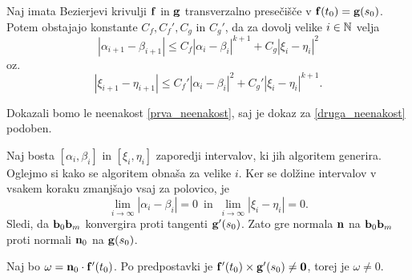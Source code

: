 \begin{trditev}
Naj imata Bezierjevi krivulji ${\bf f}$ in ${\bf g}$ transverzalno presečišče v ${\bf f}(t_0)={\bf g}(s_0)$. Potem obstajajo konstante $C_f, C_f', C_g$ in $C_g'$, da za dovolj velike $i\in \mathbb N$ velja
\begin{equation}\label{prva_neenakost}
|\alpha _{i+1} - \beta _{i+1}| \leq C_f |\alpha _{i} - \beta _{i}|^{k+1} + C_g|\xi _{i} - \eta _{i}|^2
\end{equation}
oz.
\begin{equation}\label{druga_neenakost}
|\xi _{i+1} - \eta _{i+1}| \leq C_f' |\alpha _{i} - \beta _{i}|^{2} + C_g'|\xi _{i} - \eta _{i}|^{k+1}.
\end{equation}
\end{trditev}

\proof
Dokazali bomo le neenakost \ref{prva_neenakost}, saj je dokaz za \ref{druga_neenakost} podoben. 

Naj bosta $[\alpha _i,\beta _i]$ in $[\xi _i,\eta _i]$ zaporedji intervalov, ki jih algoritem generira. Oglejmo si kako se algoritem obnaša za velike $i$. Ker se dolžine intervalov v vsakem koraku zmanjšajo vsaj za polovico, je 
\begin{equation*}
\lim _{i\rightarrow \infty} |\alpha _i-\beta _i| = 0 \,\text{ in }\, \lim _{i\rightarrow \infty} |\xi _i - \eta _i| = 0.
\end{equation*}
 Sledi, da ${\bf b}_0{\bf b}_m$ konvergira proti tangenti ${\bf g}'(s_0)$. Zato gre normala ${\bf n}$ na ${\bf b}_0{\bf b}_m$ proti normali ${\bf n}_0$ na ${\bf g}(s_0)$.

Naj bo $\omega = {\bf n}_0\cdot {\bf f}'(t_0)$. Po predpostavki je ${\bf f}'(t_0)\times {\bf g}'(s_0) \neq {\bf 0}$, torej je $\omega \neq 0$.

